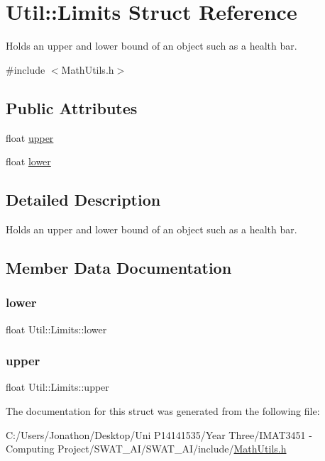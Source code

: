 \hypertarget{struct_util_1_1_limits}{}\section{Util\+:\+:Limits Struct Reference}
\label{struct_util_1_1_limits}


Holds an upper and lower bound of an object such as a health bar.  




{\ttfamily \#include $<$Math\+Utils.\+h$>$}

\subsection*{Public Attributes}
\begin{DoxyCompactItemize}
\item 
float \hyperlink{struct_util_1_1_limits_a98012e3f2aad7f395f7efd2de739769a}{upper}
\item 
float \hyperlink{struct_util_1_1_limits_a70e92804bc4d5f4b1ec3ef757f999c0a}{lower}
\end{DoxyCompactItemize}


\subsection{Detailed Description}
Holds an upper and lower bound of an object such as a health bar. 

\subsection{Member Data Documentation}
\mbox{\label{struct_util_1_1_limits_a70e92804bc4d5f4b1ec3ef757f999c0a}} 
\subsubsection{\texorpdfstring{lower}{lower}}
{\footnotesize\ttfamily float Util\+::\+Limits\+::lower}

\mbox{\label{struct_util_1_1_limits_a98012e3f2aad7f395f7efd2de739769a}} 
\subsubsection{\texorpdfstring{upper}{upper}}
{\footnotesize\ttfamily float Util\+::\+Limits\+::upper}



The documentation for this struct was generated from the following file\+:\begin{DoxyCompactItemize}
\item 
C\+:/\+Users/\+Jonathon/\+Desktop/\+Uni P14141535/\+Year Three/\+I\+M\+A\+T3451 -\/ Computing Project/\+S\+W\+A\+T\+\_\+\+A\+I/\+S\+W\+A\+T\+\_\+\+A\+I/include/\hyperlink{_math_utils_8h}{Math\+Utils.\+h}\end{DoxyCompactItemize}
